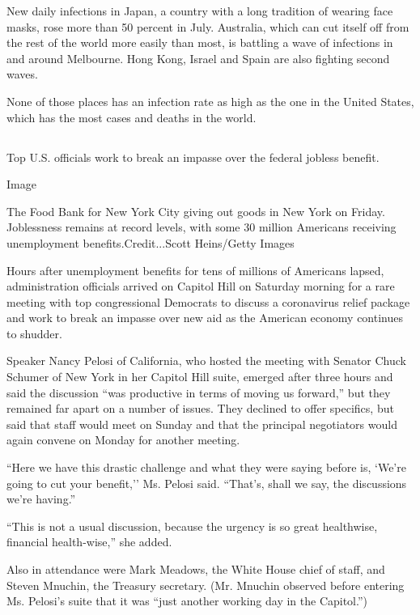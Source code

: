 New daily infections in Japan, a country with a long tradition of
wearing face masks, rose more than 50 percent in July. Australia, which
can cut itself off from the rest of the world more easily than most, is
battling a wave of infections in and around Melbourne. Hong Kong, Israel
and Spain are also fighting second waves.

None of those places has an infection rate as high as the one in the
United States, which has the most cases and deaths in the world.

\hypertarget{-1}{%
\subsection{}\label{-1}}

Top U.S. officials work to break an impasse over the federal jobless
benefit.

Image

The Food Bank for New York City giving out goods in New York on Friday.
Joblessness remains at record levels, with some 30 million Americans
receiving unemployment benefits.Credit...Scott Heins/Getty Images

Hours after unemployment benefits for tens of millions of Americans
lapsed, administration officials arrived on Capitol Hill on Saturday
morning for a rare meeting with top congressional Democrats to discuss a
coronavirus relief package and work to break an impasse over new aid as
the American economy continues to shudder.

Speaker Nancy Pelosi of California, who hosted the meeting with Senator
Chuck Schumer of New York in her Capitol Hill suite, emerged after three
hours and said the discussion ``was productive in terms of moving us
forward,'' but they remained far apart on a number of issues. They
declined to offer specifics, but said that staff would meet on Sunday
and that the principal negotiators would again convene on Monday for
another meeting.

``Here we have this drastic challenge and what they were saying before
is, `We're going to cut your benefit,'' Ms. Pelosi said. ``That's, shall
we say, the discussions we're having.''

``This is not a usual discussion, because the urgency is so great
healthwise, financial health-wise,'' she added.

Also in attendance were Mark Meadows, the White House chief of staff,
and Steven Mnuchin, the Treasury secretary. (Mr. Mnuchin observed before
entering Ms. Pelosi's suite that it was ``just another working day in
the Capitol.'')

